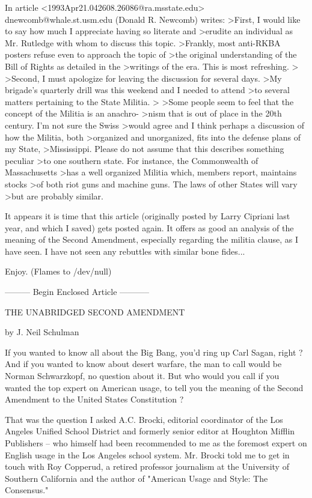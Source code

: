 \documentclass{article}
\begin{document}
In article <1993Apr21.042608.26086@ra.msstate.edu> dnewcomb@whale.st.usm.edu (Donald R. Newcomb) writes:
>First, I would like to say how much I appreciate having so literate and
>erudite an individual as Mr. Rutledge with whom to discuss this topic.
>Frankly, most anti-RKBA posters refuse even to approach the topic of
>the original understanding of the Bill of Rights as detailed in the
>writings of the era. This  is most refreshing.
>
>Second, I must apologize for leaving the discussion for several days.
>My brigade's quarterly drill was this weekend and I needed to attend
>to several matters pertaining to the State Militia.
>
>Some people seem to feel that the concept of the Militia is an anachro-
>nism that is out of place in the 20th century. I'm not sure the Swiss
>would agree and I think perhaps a discussion of how the Militia, both
>organized and unorganized, fits into the defense plans of my State,
>Mississippi. Please do not assume that this describes something peculiar
>to one southern state. For instance, the Commonwealth of Massachusetts
>has a well organized Militia which, members report, maintains stocks
>of both riot guns and machine guns. The laws of other States will vary
>but are probably similar.

It appears it is time that this article (originally posted by Larry
Cipriani last year, and which I saved) gets posted again.  It offers
as good an analysis of the meaning of the Second Amendment, especially
regarding the militia clause, as I have seen.  I have not seen any
rebuttles with similar bone fides...

Enjoy.  (Flames to /dev/null)

--------- Begin Enclosed Article -----------

                        THE UNABRIDGED SECOND AMENDMENT

                              by J. Neil Schulman

If you wanted to know all about the Big Bang, you'd ring up Carl Sagan,
right ?  And if you wanted to know about desert warfare, the man to call
would be Norman Schwarzkopf, no question about it.  But who would you call
if you wanted the top expert on American usage, to tell you the meaning
of the Second Amendment to the United States Constitution ?

That was the question I asked A.C. Brocki, editorial coordinator of the Los
Angeles Unified School District and formerly senior editor at Houghton
Mifflin Publishers -- who himself had been recommended to me as the
foremost expert on English usage in the Los Angeles school system.  Mr.
Brocki told me to get in touch with Roy Copperud, a retired professor
journalism at the University of Southern California and the author of
"American Usage and Style: The Consensus."
\end{document}
